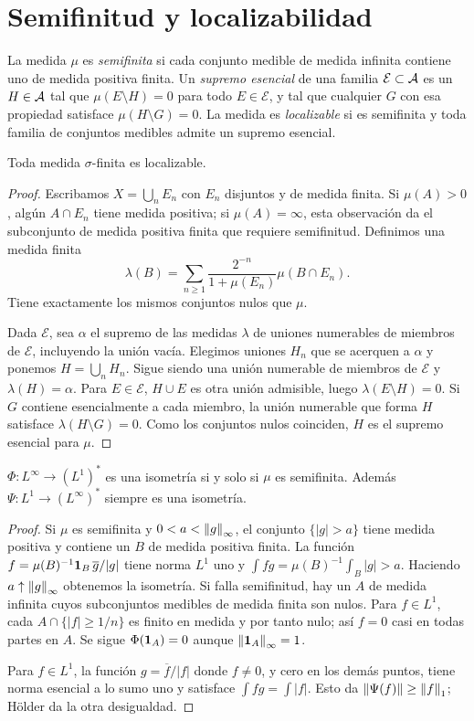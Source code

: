 \section{Semifinitud y localizabilidad}
\begin{definicion}
La medida $\mu$ es \emph{semifinita} si cada conjunto medible de medida infinita contiene uno de medida positiva finita. Un \emph{supremo esencial} de una familia $\mathcal E\subset\mathcal A$ es un $H\in\mathcal A$ tal que $\mu(E\setminus H)=0$ para todo $E\in\mathcal E$, y tal que cualquier $G$ con esa propiedad satisface $\mu(H\setminus G)=0$. La medida es \emph{localizable} si es semifinita y toda familia de conjuntos medibles admite un supremo esencial.
\end{definicion}
\begin{proposicion}\label{v2:sigma-localizable}
Toda medida $\sigma$-finita es localizable.
\end{proposicion}
\begin{proof}
Escribamos $X=\bigcup_n E_n$ con $E_n$ disjuntos y de medida finita. Si $\mu(A)>0$, algún $A\cap E_n$ tiene medida positiva; si $\mu(A)=\infty$, esta observación da el subconjunto de medida positiva finita que requiere semifinitud. Definimos una medida finita
\[
 \lambda(B)=\sum_{n\ge1}\frac{2^{-n}}{1+\mu(E_n)}\mu(B\cap E_n).
\]
Tiene exactamente los mismos conjuntos nulos que $\mu$.

Dada $\mathcal E$, sea $\alpha$ el supremo de las medidas $\lambda$ de uniones numerables de miembros de $\mathcal E$, incluyendo la unión vacía. Elegimos uniones $H_n$ que se acerquen a $\alpha$ y ponemos $H=\bigcup_nH_n$. Sigue siendo una unión numerable de miembros de $\mathcal E$ y $\lambda(H)=\alpha$. Para $E\in\mathcal E$, $H\cup E$ es otra unión admisible, luego $\lambda(E\setminus H)=0$. Si $G$ contiene esencialmente a cada miembro, la unión numerable que forma $H$ satisface $\lambda(H\setminus G)=0$. Como los conjuntos nulos coinciden, $H$ es el supremo esencial para $\mu$.
\end{proof}
\begin{proposicion}\label{v2:l1-isometria}
$\Phi:L^\infty\to(L^1)^*$ es una isometría si y solo si $\mu$ es semifinita. Además $\Psi:L^1\to(L^\infty)^*$ siempre es una isometría.
\end{proposicion}
\begin{proof}
Si $\mu$ es semifinita y $0<a<\left\lVert g\right\rVert_\infty$, el conjunto $\{|g|>a\}$ tiene medida positiva y contiene un $B$ de medida positiva finita. La función
$f=\mu(B)^{-1}\mathbf1_{B}\,\overline g/|g|$ tiene norma $L^1$ uno y $\int fg=\mu(B)^{-1}\int_B|g|>a$. Haciendo $a\uparrow\left\lVert g\right\rVert_\infty$ obtenemos la isometría. Si falla semifinitud, hay un $A$ de medida infinita cuyos subconjuntos medibles de medida finita son nulos. Para $f\in L^1$, cada $A\cap\{|f|\ge1/n\}$ es finito en medida y por tanto nulo; así $f=0$ casi en todas partes en $A$. Se sigue $\Phi(\mathbf1_{A})=0$ aunque $\left\lVert\mathbf1_{A}\right\rVert_\infty=1$.

Para $f\in L^1$, la función $g=\overline f/|f|$ donde $f\ne0$, y cero en los demás puntos, tiene norma esencial a lo sumo uno y satisface $\int fg=\int|f|$. Esto da $\left\lVert\Psi(f)\right\rVert\ge\left\lVert f\right\rVert_1$; Hölder da la otra desigualdad.
\end{proof}
